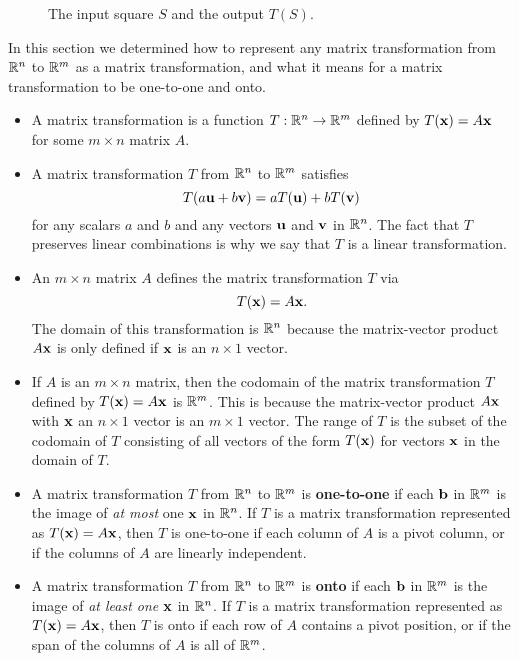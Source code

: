 \begin{example}
	\ea
\begin{figure}[ht]
\begin{center}
\caption{The input square $S$ and the output $T(S)$.}
\label{F:ex:1_g_polygons}
\end{center}
\end{figure}






\end{example}


In this section we determined how to represent any matrix transformation from $\mathbb{R}^n$ to $\mathbb{R}^m$ as a matrix transformation, and what it means for a matrix transformation to be one-to-one and onto.
\begin{itemize}
\item A matrix transformation is a function $T: \mathbb{R}^n \to \mathbb{R}^m$ defined by $T(\mathbf{x}) = A\mathbf{x}$ for some $m \times n$ matrix $A$. 
\item A matrix transformation $T$ from $\mathbb{R}^n$ to $\mathbb{R}^m$ satisfies 
\[T(a\mathbf{u} + b\mathbf{v}) = aT(\mathbf{u}) + bT(\mathbf{v})\]
for any scalars $a$ and $b$ and any vectors $\mathbf{u}$ and $\mathbf{v}$ in $\mathbb{R}^n$. The fact that $T$ preserves linear combinations is why we say that $T$ is a linear transformation. 
\item An $m \times n$ matrix $A$ defines the matrix transformation $T$ via 
\[T(\mathbf{x}) = A \mathbf{x}.\]
The domain of this transformation is $\mathbb{R}^n$ because the matrix-vector product $A \mathbf{x}$ is only defined if $\mathbf{x}$ is an $n \times 1$ vector. 
\item If $A$ is an $m \times n$ matrix, then the codomain of the matrix transformation $T$ defined by $T(\mathbf{x}) = A \mathbf{x}$ is $\mathbb{R}^m$. This is because the matrix-vector product $A \mathbf{x}$ with $\mathbf{x}$ an $n \times 1$ vector is an $m \times 1$ vector. The range of $T$ is the subset of the codomain of $T$ consisting of all vectors of the form $T(\mathbf{x})$ for vectors $\mathbf{x}$ in the domain of $T$.
\item A matrix transformation $T$ from $\mathbb{R}^n$ to $\mathbb{R}^m$ is \textbf{one-to-one} if each $\mathbf{b}$ in $\mathbb{R}^m$ is the image of \emph{at most} one $\mathbf{x}$ in $\mathbb{R}^n$. If $T$ is a matrix transformation represented as $T(\mathbf{x}) = A\mathbf{x}$, then $T$ is one-to-one if each column of $A$ is a pivot column, or if the columns of $A$ are linearly independent.  
\item A matrix transformation $T$ from $\mathbb{R}^n$ to $\mathbb{R}^m$ is \textbf{onto} if each $\mathbf{b}$ in $\mathbb{R}^m$ is the image of \emph{at least one} $\mathbf{x}$ in $\mathbb{R}^n$. If $T$ is a matrix transformation represented as $T(\mathbf{x}) = A\mathbf{x}$, then $T$ is onto if each row of $A$ contains a pivot position, or if the span of the columns of $A$ is all of $\mathbb{R}^m$.
\end{itemize}




